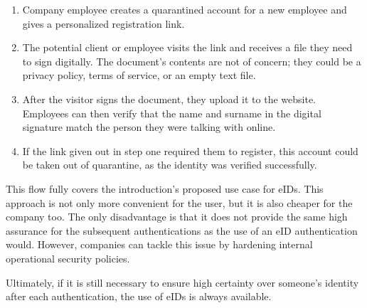 \begin{enumerate}
    \item Company employee creates a quarantined account for a new employee and gives a personalized registration link.
    \item The potential client or employee visits the link and receives a file they need to sign digitally. The document's contents are not of concern; they could be a privacy policy, terms of service, or an empty text file.
    \item After the visitor signs the document, they upload it to the website. Employees can then verify that the name and surname in the digital signature match the person they were talking with online.
    \item If the link given out in step one required them to register, this account could be taken out of quarantine, as the identity was verified successfully.
\end{enumerate}

This flow fully covers the introduction's proposed use case for eIDs. This approach is not only more convenient for the user, but it is also cheaper for the company too. The only disadvantage is that it does not provide the same high assurance for the subsequent authentications as the use of an eID authentication would. However, companies can tackle this issue by hardening internal operational security policies.

Ultimately, if it is still necessary to ensure high certainty over someone's identity after each authentication, the use of eIDs is always available.